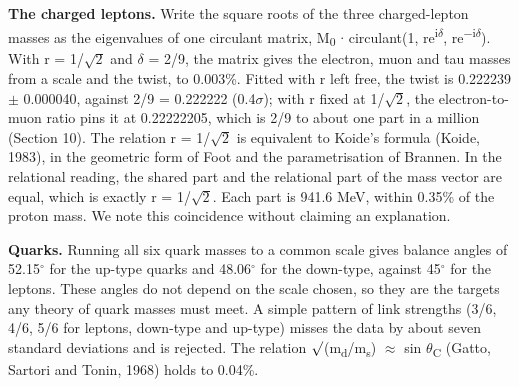 \documentclass[
  11pt,
]{article}
\begin{document}
\textbf{The charged leptons.} Write the square roots of the three charged-lepton masses as the eigenvalues of one circulant matrix, M\textsubscript{0} \ensuremath{\cdot} circulant(1, re\textsuperscript{i\ensuremath{\delta}}, re\textsuperscript{\ensuremath{-}i\ensuremath{\delta}}). With r = 1/\ensuremath{\sqrt{2}} and \ensuremath{\delta} = 2/9, the matrix gives the electron, muon and tau masses from a scale and the twist, to 0.003\%. Fitted with r left free, the twist is 0.222239 \ensuremath{\pm} 0.000040, against 2/9 = 0.222222 (0.4\ensuremath{\sigma}); with r fixed at 1/\ensuremath{\sqrt{2}}, the electron-to-muon ratio pins it at 0.22222205, which is 2/9 to about one part in a million (Section 10). The relation r = 1/\ensuremath{\sqrt{2}} is equivalent to Koide's formula (Koide, 1983), in the geometric form of Foot and the parametrisation of Brannen. In the relational reading, the shared part and the relational part of the mass vector are equal, which is exactly r = 1/\ensuremath{\sqrt{2}}. Each part is 941.6 MeV, within 0.35\% of the proton mass. We note this coincidence without claiming an explanation.

\textbf{Quarks.} Running all six quark masses to a common scale gives balance angles of 52.15\ensuremath{^\circ} for the up-type quarks and 48.06\ensuremath{^\circ} for the down-type, against 45\ensuremath{^\circ} for the leptons. These angles do not depend on the scale chosen, so they are the targets any theory of quark masses must meet. A simple pattern of link strengths (3/6, 4/6, 5/6 for leptons, down-type and up-type) misses the data by about seven standard deviations and is rejected. The relation \ensuremath{\surd}(m\textsubscript{d}/m\textsubscript{s}) \ensuremath{\approx} sin \ensuremath{\theta}\textsubscript{C} (Gatto, Sartori and Tonin, 1968) holds to 0.04\%.
\end{document}
